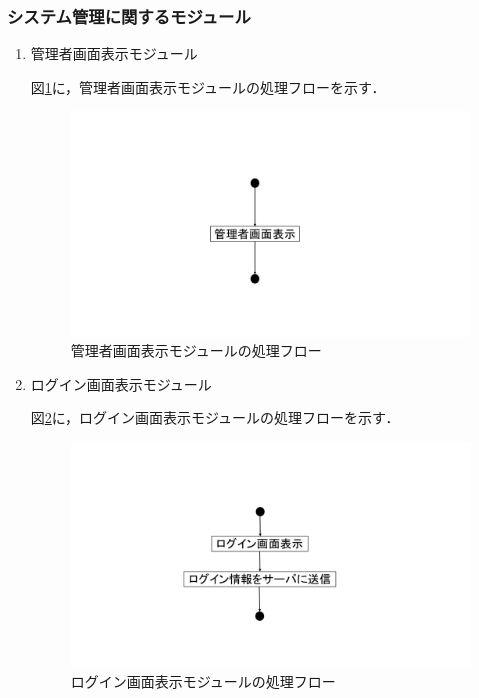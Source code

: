 \subsubsection{システム管理に関するモジュール}
\begin{enumerate}
\renewcommand{\labelenumi}{(\arabic{enumi})}
\item 管理者画面表示モジュール

図\ref{fig;2-1}に，管理者画面表示モジュールの処理フローを示す．

\begin{figure}[H]
	\begin{center}
	\includegraphics[width=15cm, bb=0 0 1000 540, clip]{./app_pic/app2-1.pdf}
	\caption{管理者画面表示モジュールの処理フロー}
	\label{fig;2-1}
	\end{center}
\end{figure}

\item ログイン画面表示モジュール

図\ref{fig;2-2}に，ログイン画面表示モジュールの処理フローを示す．

\begin{figure}[H]
	\begin{center}
	\includegraphics[width=15cm, bb=0 0 1000 540, clip]{./app_pic/app2-2.pdf}
	\caption{ログイン画面表示モジュールの処理フロー}
	\label{fig;2-2}
	\end{center}
\end{figure}


\end{enumerate}
